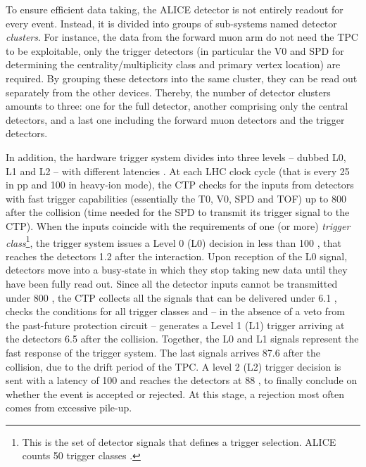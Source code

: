 To ensure efficient data taking, the ALICE detector is not entirely readout for every event. Instead, it is divided into groups of sub-systems named detector \textit{clusters}. For instance, the data from the forward muon arm do not need the TPC to be exploitable, only the trigger detectors (in particular the V0 and SPD for determining the centrality/multiplicity class and primary vertex location) are required. By grouping these detectors into the same cluster, they can be read out separately from the other devices. Thereby, the number of detector clusters amounts to three: one for the full detector, another comprising only the central detectors, and a last one including the forward muon detectors and the trigger detectors.

In addition, the hardware trigger system divides into three levels -- dubbed L0, L1 and L2 -- with different latencies \cite{bloodworthALICECentralTrigger2000}\cite{alicecollaborationTriggerDataAcquisition}. At each LHC clock cycle (that is every 25 \nsec in pp and 100 \nsec in heavy-ion mode), the CTP checks for the inputs from detectors with fast trigger capabilities (essentially the T0, V0, SPD and TOF) up to 800 \nsec after the collision (time needed for the SPD to transmit its trigger signal to the CTP). When the inputs coincide with the requirements of one (or more) \textit{trigger class}\footnote{This is the set of detector signals that defines a trigger selection. ALICE counts 50 trigger classes \cite{alicecollaborationALICEExperimentCERN2008}.}, the trigger system issues a Level 0 (L0) decision in less than 100 \nsec, that reaches the detectors 1.2 \musec after the interaction. Upon reception of the L0 signal, detectors move into a busy-state in which they stop taking new data until they have been fully read out. Since all the detector inputs cannot be transmitted under 800 \nsec, the CTP collects all the signals that can be delivered under 6.1 \musec, checks the conditions for all trigger classes and -- in the absence of a veto from the past-future protection circuit -- generates a Level 1 (L1) trigger arriving at the detectors 6.5 \musec after the collision. Together, the L0 and L1 signals represent the fast response of the trigger system. The last signals arrives 87.6 \musec after the collision, due to the drift period of the TPC. A level 2 (L2) trigger decision is sent with a latency of 100 \nsec and reaches the detectors at 88 \musec, to finally conclude on whether the event is accepted or rejected. At this stage, a rejection most often comes from excessive pile-up.\\

